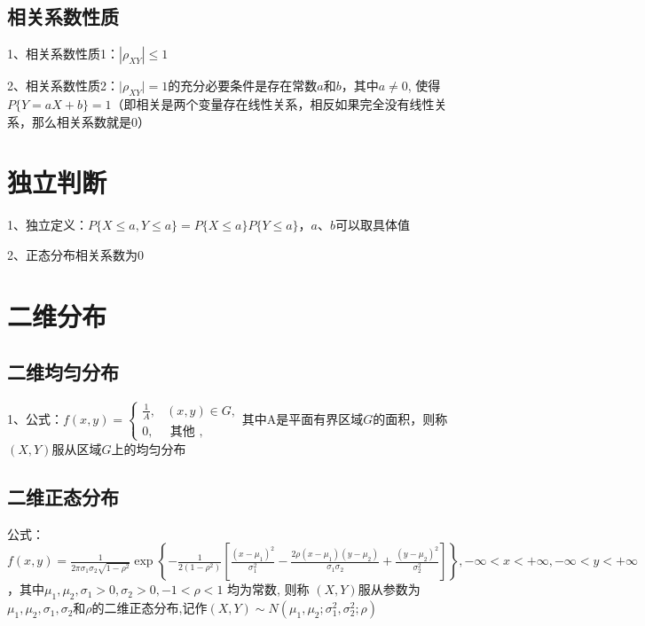 \subsection{相关系数性质}

1、相关系数性质1：$\left|\rho_{X Y}\right| \leqslant 1$

2、相关系数性质2：$\mid \rho_{X Y} \mid=1$的充分必要条件是存在常数$a$和$b$，其中$a \neq 0$, 使得$P\{Y=a X+b\}=1$（即相关是两个变量存在线性关系，相反如果完全没有线性关系，那么相关系数就是0）

\section{独立判断}

1、独立定义：$P\{X \le a, Y \le a\} = P\{X \le a\}P\{Y \le a\}$，$a$、$b$可以取具体值

2、正态分布相关系数为0

\section{二维分布}



\subsection{二维均匀分布}

1、公式：$f(x, y)=\left\{\begin{array}{lc}

\frac{1}{A}, & (x, y) \in G, \\

0, & \text { 其他 },

\end{array}\right.$其中A是平面有界区域$G$的面积，则称$(X,Y)$服从区域$G$上的均匀分布



\subsection{二维正态分布}

公式：$f(x, y)=\frac{1}{2 \pi \sigma_{1} \sigma_{2} \sqrt{1-\rho^{2}}} \exp \left\{-\frac{1}{2\left(1-\rho^{2}\right)}\left[\frac{\left(x-\mu_{1}\right)^{2}}{\sigma_{1}^{2}}-\frac{2 \rho\left(x-\mu_{1}\right)\left(y-\mu_{2}\right)}{\sigma_{1} \sigma_{2}}+\frac{\left(y-\mu_{2}\right)^{2}}{\sigma_{2}^{2}}\right]\right\},-\infty<x<+\infty,-\infty<y<+\infty$，其中$\mu_{1}, \mu_{2}, \sigma_{1}>0, \sigma_{2}>0,-1<\rho<1$ 均为常数, 则称 $(X, Y) $服从参数为$\mu_{1}, \mu_{2}, \sigma_{1}, \sigma_{2}$和$\rho$的二维正态分布,记作$(X, Y) \sim N\left(\mu_{1}, \mu_{2} ; \sigma_{1}^{2}, \sigma_{2}^{2} ; \rho\right)$



